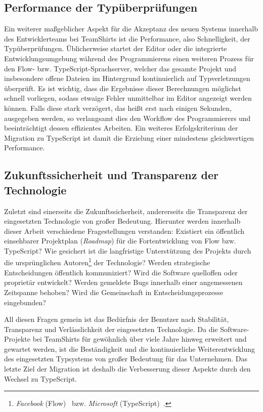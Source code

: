\subsection{Performance der Typüberprüfungen}

Ein weiterer maßgeblicher Aspekt für die Akzeptanz des neuen Systems innerhalb des Entwicklerteams bei TeamShirts ist die Performance, also Schnelligkeit, der Typüberprüfungen. Üblicherweise startet der Editor oder die integrierte Entwicklungsumgebung während des Programmierens einen weiteren Prozess für den Flow- bzw. TypeScript-Sprachserver, welcher das gesamte Projekt und insbesondere offene Dateien im Hintergrund kontinuierlich auf Typverletzungen überprüft. Es ist wichtig, dass die Ergebnisse dieser Berechnungen möglichst schnell vorliegen, sodass etwaige Fehler unmittelbar im Editor angezeigt werden können. Falls diese stark verzögert, das heißt erst nach einigen Sekunden, ausgegeben werden, so verlangsamt dies den Workflow des Programmierers und beeinträchtigt dessen effizientes Arbeiten. Ein weiteres Erfolgskriterium der Migration zu TypeScript ist damit die Erzielung einer mindestens gleichwertigen Performance.

\subsection{Zukunftssicherheit und Transparenz der Technologie}

Zuletzt sind einerseits die Zukunftssicherheit, andererseits die Transparenz der eingesetzten Technologie von großer Bedeutung. Hierunter werden innerhalb dieser Arbeit verschiedene Fragestellungen verstanden: Existiert ein öffentlich einsehbarer Projektplan (\textit{Roadmap}) für die Fortentwicklung von Flow bzw. TypeScript? Wie gesichert ist die langfristige Unterstützung des Projekts durch die ursprünglichen Autoren\footnote{\textit{Facebook} (Flow)~\autocite{FLOW:PAPER} bzw. \emph{Microsoft} (TypeScript)~\autocite{TYPESCRIPT:SPEC}.} der Technologie? Werden strategische Entscheidungen öffentlich kommuniziert? Wird die Software quelloffen oder proprietär entwickelt? Werden gemeldete Bugs innerhalb einer angemessenen Zeitspanne behoben? Wird die Gemeinschaft in Entscheidungsprozesse eingebunden?

All diesen Fragen gemein ist das Bedürfnis der Benutzer nach Stabilität, Transparenz und Verlässlichkeit der eingesetzten Technologie. Da die Software-Projekte bei TeamShirts für gewöhnlich über viele Jahre hinweg erweitert und gewartet werden, ist die Beständigkeit und die kontinuierliche Weiterentwicklung des eingesetzten Typsystems von großer Bedeutung für das Unternehmen. Das letzte Ziel der Migration ist deshalb die Verbesserung dieser Aspekte durch den Wechsel zu TypeScript.

